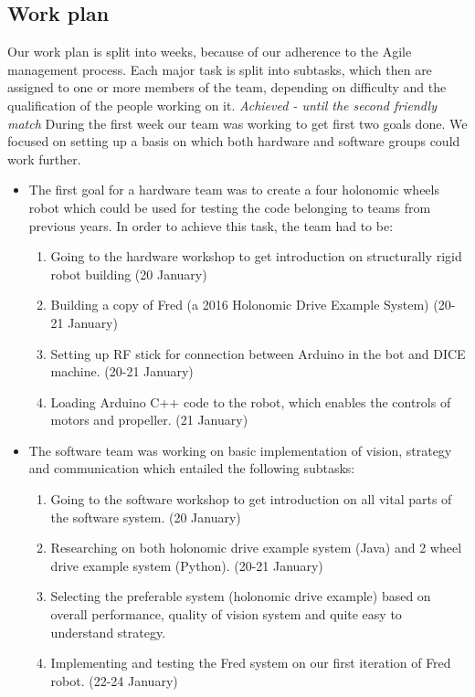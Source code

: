 \documentclass[12pt,oneside]{article}
\begin{document}
		\subsection{Work plan}
			Our work plan is split into weeks, because of our adherence to the Agile management process. Each major task is split into subtasks, which then are assigned to one or more members of the team, depending on difficulty and the qualification of the people working on it.
			\emph{Achieved - until the second friendly match}
			During the first week our team was working to get first two goals done. We focused on setting up a basis on which both hardware and software groups could work further.
			\begin{itemize}
				\item The first goal for a hardware team was to create a four holonomic wheels robot which could be used for testing the code belonging to teams from previous years. In order to achieve this task, the team had to be:
				\begin{enumerate}
					\item Going to the hardware workshop to get introduction on structurally rigid robot building (20 January)
					\item Building a copy of Fred (a 2016 Holonomic Drive Example System) (20-21 January)
					\item Setting up RF stick for connection between Arduino in the bot and DICE machine. (20-21 January)
					\item Loading Arduino C++ code to the robot, which enables the controls of motors and propeller. (21 January)
				\end{enumerate}
				\item The software team was working on basic implementation of vision, strategy and communication which entailed the following subtasks: 
				\begin{enumerate}
					\item Going to the software workshop to get introduction on all vital parts of the software system. (20 January)
					\item Researching on both holonomic drive example system (Java) and 2 wheel drive example system (Python). (20-21 January)
					\item Selecting the preferable system (holonomic drive example) based on overall performance, quality of vision system and quite easy to understand strategy. 
					\item Implementing and testing the Fred system on our first iteration of Fred robot. (22-24 January)
				\end{enumerate}
			\end{itemize}
\end{document}

